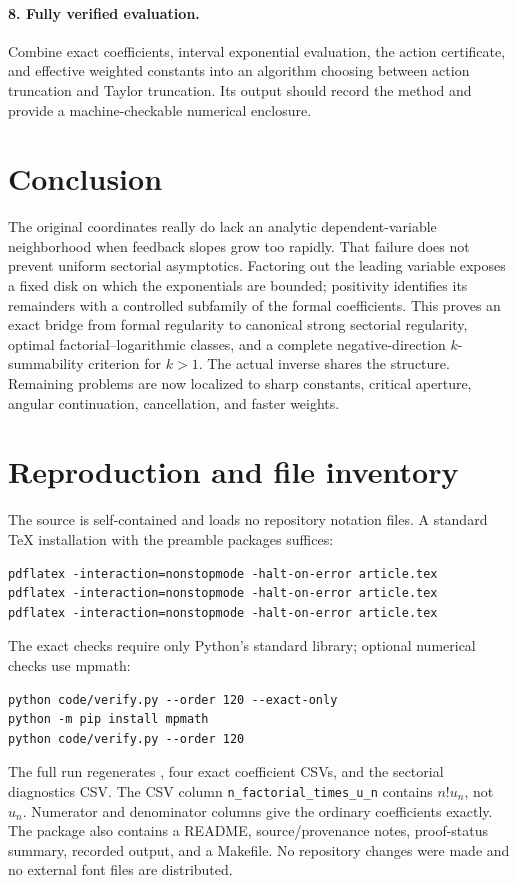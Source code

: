 \documentclass[11pt,a4paper]{article}
\numberwithin{equation}{section}
\theoremstyle{definition}\newtheorem{definition}[theorem]{Definition}
\theoremstyle{remark}\newtheorem{remark}[theorem]{Remark}
\begin{document}
\paragraph{8. Fully verified evaluation.}
Combine exact coefficients, interval exponential evaluation, the action
certificate, and effective weighted constants into an algorithm choosing
between action truncation and Taylor truncation. Its output should record
the method and provide a machine-checkable numerical enclosure.

\section{Conclusion}
The original coordinates really do lack an analytic dependent-variable
neighborhood when feedback slopes grow too rapidly. That failure does
not prevent uniform sectorial asymptotics. Factoring out the leading
variable exposes a fixed disk on which the exponentials are bounded;
positivity identifies its remainders with a controlled subfamily of the
formal coefficients.
This proves an exact bridge from formal regularity to canonical strong
sectorial regularity, optimal factorial--logarithmic classes, and a
complete negative-direction $k$-summability criterion for $k>1$.
The actual inverse shares the structure. Remaining problems are now
localized to sharp constants, critical aperture, angular continuation,
cancellation, and faster weights.

\appendix
\section{Reproduction and file inventory}
The source is self-contained and loads no repository notation files.
A standard TeX installation with the preamble packages suffices:
\begin{lstlisting}
pdflatex -interaction=nonstopmode -halt-on-error article.tex
pdflatex -interaction=nonstopmode -halt-on-error article.tex
pdflatex -interaction=nonstopmode -halt-on-error article.tex
\end{lstlisting}
The exact checks require only Python's standard library; optional numerical
checks use mpmath:
\begin{lstlisting}
python code/verify.py --order 120 --exact-only
python -m pip install mpmath
python code/verify.py --order 120
\end{lstlisting}
The full run regenerates , four exact
coefficient CSVs, and the sectorial diagnostics CSV. The CSV column
\texttt{n\_factorial\_times\_u\_n} contains $n!u_n$, not $u_n$.
Numerator and denominator columns give the ordinary coefficients exactly.
The package also contains a README, source/provenance notes, proof-status
summary, recorded output, and a Makefile. No repository changes were made
and no external font files are distributed.
\end{document}
